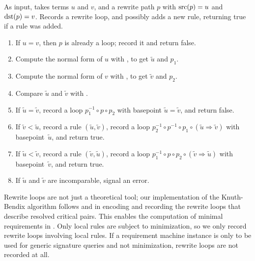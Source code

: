 \documentclass[../generics]{subfiles}
\begin{document}
\begin{algorithm}\label{add rule derived algo}
As input, takes terms $u$ and $v$, and a rewrite path $p$ with $\operatorname{src}(p)=u$ and $\operatorname{dst}(p)=v$. Records a rewrite loop, and possibly adds a new rule, returning true if a rule was added.
\begin{enumerate}
\item If $u=v$, then $p$ is already a loop; record it and return false.
\item Compute the normal form of $u$ with , to get $\tilde{u}$ and $p_1$.
\item Compute the normal form of $v$ with , to get $\tilde{v}$ and $p_2$.
\item Compare $\tilde{u}$ and $\tilde{v}$ with .
\item {}If $\tilde{u}=\tilde{v}$, record a loop $p_1^{-1}\circ p\circ p_2$ with basepoint $\tilde{u}=\tilde{v}$, and return false.
\item If $\tilde{v}<\tilde{u}$, record a rule $(\tilde{u}, \tilde{v})$, record a loop $p_2^{-1}\circ p^{-1}\circ p_1\circ (\tilde{u}\Rightarrow \tilde{v})$ with basepoint~$\tilde{u}$, and return true.
\item If $\tilde{u}<\tilde{v}$, record a rule $(\tilde{v}, \tilde{u})$, record a loop $p_1^{-1}\circ p \circ p_2 \circ (\tilde{v}\Rightarrow \tilde{u})$ with basepoint~$\tilde{v}$, and return true.
\item If $\tilde{u}$ and $\tilde{v}$ are incomparable, signal an error.
\end{enumerate}
\end{algorithm}
Rewrite loops are not just a theoretical tool; our implementation of the Knuth-Bendix algorithm follows \cite{loggedrewriting} and \cite{homotopicalcompletion} in encoding and recording the rewrite loops that describe resolved critical pairs. This enables the computation of minimal requirements in . Only local rules are subject to minimization, so we only record rewrite loops involving local rules. If a requirement machine instance is only to be used for generic signature queries and not minimization, rewrite loops are not recorded at all.
\end{document}
